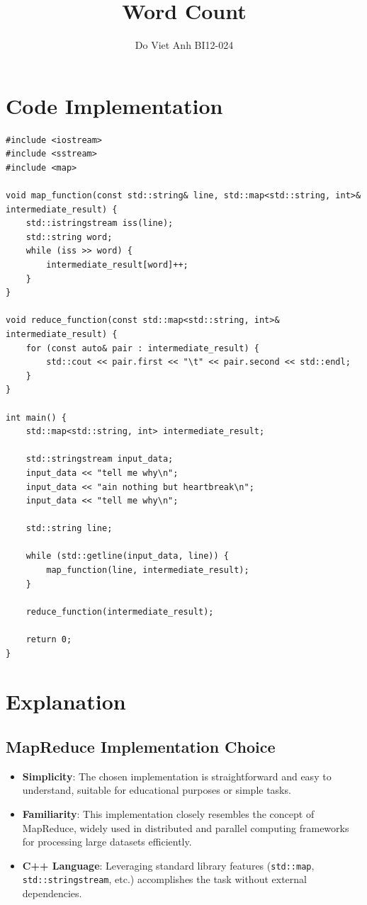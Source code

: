 \documentclass{article}
\title{Word Count}
\author{Do Viet Anh BI12-024}
\begin{document}
\maketitle

\section{Code Implementation}

\lstset{language=C++}
\begin{lstlisting}
#include <iostream>
#include <sstream>
#include <map>

void map_function(const std::string& line, std::map<std::string, int>& intermediate_result) {
    std::istringstream iss(line);
    std::string word;
    while (iss >> word) {
        intermediate_result[word]++;
    }
}

void reduce_function(const std::map<std::string, int>& intermediate_result) {
    for (const auto& pair : intermediate_result) {
        std::cout << pair.first << "\t" << pair.second << std::endl;
    }
}

int main() {
    std::map<std::string, int> intermediate_result;

    std::stringstream input_data;
    input_data << "tell me why\n";
    input_data << "ain nothing but heartbreak\n";
    input_data << "tell me why\n";

    std::string line;
    
    while (std::getline(input_data, line)) {
        map_function(line, intermediate_result);
    }

    reduce_function(intermediate_result);

    return 0;
}
\end{lstlisting}

\section{Explanation}

\subsection{MapReduce Implementation Choice}
\begin{itemize}
    \item \textbf{Simplicity}: The chosen implementation is straightforward and easy to understand, suitable for educational purposes or simple tasks.
    \item \textbf{Familiarity}: This implementation closely resembles the concept of MapReduce, widely used in distributed and parallel computing frameworks for processing large datasets efficiently.
    \item \textbf{C++ Language}: Leveraging standard library features (\texttt{std::map}, \texttt{std::stringstream}, etc.) accomplishes the task without external dependencies.
\end{itemize}
\end{document}
